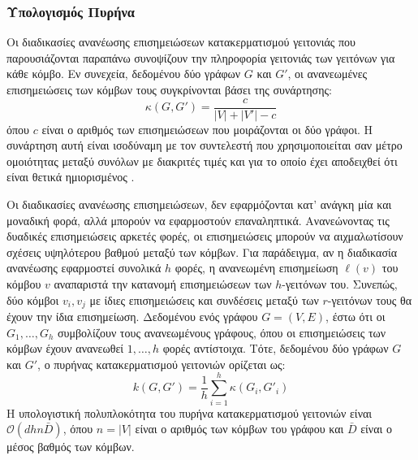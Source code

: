 \subsubsection{Υπολογισμός Πυρήνα}
Οι διαδικασίες ανανέωσης επισημειώσεων κατακερματισμού γειτονιάς που παρουσιάζονται παραπάνω συνοψίζουν την πληροφορία γειτονιάς των γειτόνων για κάθε κόμβο.
Εν συνεχεία, δεδομένου δύο γράφων $G$ και $G'$, οι ανανεωμένες επισημειώσεις των κόμβων τους συγκρίνονται βάσει της συνάρτησης:
\begin{equation}
    \kappa(G, G') = \frac{c}{|V| + |V'| - c}
\end{equation}
όπου $c$ είναι ο αριθμός των επισημειώσεων που μοιράζονται οι δύο γράφοι.
Η συνάρτηση αυτή είναι ισοδύναμη με τον συντελεστή \textit{} που χρησιμοποιείται σαν μέτρο ομοιότητας μεταξύ συνόλων με διακριτές τιμές και για το οποίο έχει αποδειχθεί ότι είναι θετικά ημιορισμένος \cite{gower1971general}.\par
Οι διαδικασίες ανανέωσης επισημειώσεων, δεν εφαρμόζονται κατ' ανάγκη μία και μοναδική φορά, αλλά μπορούν να εφαρμοστούν επαναληπτικά.
Ανανεώνοντας τις δυαδικές επισημειώσεις αρκετές φορές, οι επισημειώσεις μπορούν να αιχμαλωτίσουν σχέσεις υψηλότερου βαθμού μεταξύ των κόμβων.
Για παράδειγμα, αν η διαδικασία ανανέωσης εφαρμοστεί συνολικά $h$ φορές, η ανανεωμένη επισημείωση $\ell(v)$ του κόμβου $v$ αναπαριστά την κατανομή επισημειώσεων των $h$-γειτόνων του.
Συνεπώς, δύο κόμβοι $v_i, v_j$ με ίδιες επισημειώσεις και συνδέσεις μεταξύ των $r$-γειτόνων τους θα έχουν την ίδια επισημείωση.
Δεδομένου ενός γράφου $G=(V,E)$, έστω ότι οι $G_1, \ldots, G_h$ συμβολίζουν τους ανανεωμένους γράφους, όπου οι επισημειώσεις των κόμβων έχουν ανανεωθεί $1,\ldots,h$ φορές αντίστοιχα.
Τότε, δεδομένου δύο γράφων $G$ και $G'$, ο πυρήνας κατακερματισμού γειτονιών ορίζεται ως:
\begin{equation}
    k(G, G') = \frac{1}{h} \sum_{i=1}^h \kappa(G_i, G'_i)
\label{eq:framework_sum}
\end{equation}
Η υπολογιστική πολυπλοκότητα του πυρήνα κατακερματισμού γειτονιών είναι $\mathcal{O}(dhn\bar{D})$, όπου $n=|V|$ είναι ο αριθμός των κόμβων του γράφου και $\bar{D}$ είναι ο μέσος βαθμός των κόμβων.

